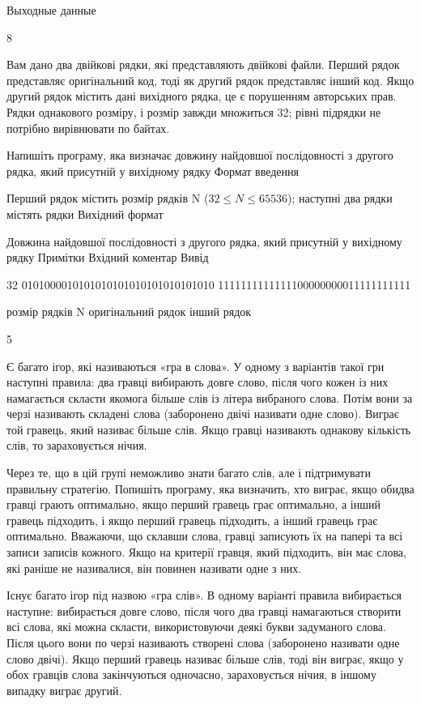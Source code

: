 \documentclass[]{article}
\begin{document}
\begin{enumerate}
Выходные данные

8



Вам дано два двійкові рядки, які представляють двійкові файли. Перший рядок представляє оригінальний код, тоді як другий рядок представляє інший код. Якщо другий рядок містить дані вихідного рядка, це є порушенням авторських прав. Рядки однакового розміру, і розмір завжди множиться 32; рівні підрядки не потрібно вирівнювати по байтах.

Напишіть програму, яка визначає довжину найдовшої послідовності з другого рядка, який присутній у вихідному рядку
Формат введення

Перший рядок містить розмір рядків N ($32 \le N \le 65536$); наступні два рядки містять рядки
Вихідний формат

Довжина найдовшої послідовності з другого рядка, який присутній у вихідному рядку
Примітки
Вхідний коментар Вивід

32
0101000010101010101010101010101010
1111111111111100000000011111111111



розмір рядків N
оригінальний рядок
інший рядок



5



Є багато ігор, які називаються «гра в слова». У одному з варіантів такої гри наступні правила: два гравці вибирають довге слово, після чого кожен із них намагається скласти якомога більше слів із літера вибраного слова. Потім вони за черзі називають складені слова (заборонено двічі називати одне слово). Виграє той гравець, який називає більше слів. Якщо гравці називають однакову кількість слів, то зараховується нічия.

Через те, що в цій групі неможливо знати багато слів, але і підтримувати правильну стратегію. Попишіть програму, яка визначить, хто виграє, якщо обидва гравці грають оптимально, якщо перший гравець грає оптимально, а інший гравець підходить, і якщо перший гравець підходить, а інший гравець грає оптимально. Вважаючи, що склавши слова, гравці записують їх на папері та всі записи записів кожного. Якщо на критерії гравця, який підходить, він має слова, які раніше не називалися, він повинен називати одне з них.

Існує багато ігор під назвою «гра слів». В одному варіанті правила вибирається наступне: вибирається довге слово, після чого два гравці намагаються створити всі слова, які можна скласти, використовуючи деякі букви задуманого слова. Після цього вони по черзі називають створені слова (заборонено називати одне слово двічі). Якщо перший гравець називає більше слів, тоді він виграє, якщо у обох гравців слова закінчуються одночасно, зараховується нічия, в іншому випадку виграє другий.


\end{enumerate}
\end{document}
